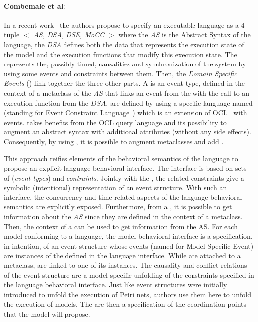 {\paragraph{Combemale et al: }
In a recent work~\cite{sle13-combemale} the authors propose to specify an executable language as a 4-tuple \emph{$<$ AS, DSA, DSE, MoCC $>$} where the \emph{AS} is the Abstract Syntax of the language, the \emph{DSA} defines both the data that represents the execution state of the model and the execution functions that modify this execution state. The \mocc represents the, possibly timed, causalities and synchronization of the system by using some events and constraints between them. Then, the \emph{Domain Specific Events} (\dse) link together the three other parts. A \dse is an event type, defined in the context of a metaclass of the \emph{AS} that links an event from the \mocc with the call to an execution function from the $DSA$. \dse are defined by using a specific language named \ecl (standing for Event Constraint Language~\cite{eclbib}) which is an extension of OCL~\cite{omgocl2bib} with events. \ecl takes benefits from the OCL query language and its possibility to augment an abstract syntax with additional attributes (without any side effects). Consequently, by using \ecl, it is possible to augment \as metaclasses and add \dse. 

This approach reifies elements of the behavioral semantics of the language to propose an explicit language behavioral interface. The interface is based on sets of \dse (\emph{event types}) and \emph{contraints}. Jointly with the \dse, the related constraints give a symbolic (intentional) representation of an event structure. With such an interface, the concurrency and time-related aspects of the language behavioral semantics are explicitly exposed.
%
Furthermore, from a \dse, it is possible to get information about the \emph{AS} since they are defined in the context of a metaclass. Then, the context of a \dse can be used to get information from the AS.   
For each model conforming to a language, the model behavioral interface is a specification, in intention, of an event structure whose events (named \mse for Model Specific Event) are instances of the \dse defined in the language interface. While \dse are attached to a metaclass, \mse are linked to one of its instances. The causality and conflict relations of the event structure are a model-specific unfolding of the constraints specified in the language behavioral interface. Just like event structures were initially introduced to unfold the execution of Petri nets, authors use them here to unfold the execution of models. The \dse are then a specification of the coordination points that the model will propose.

}
